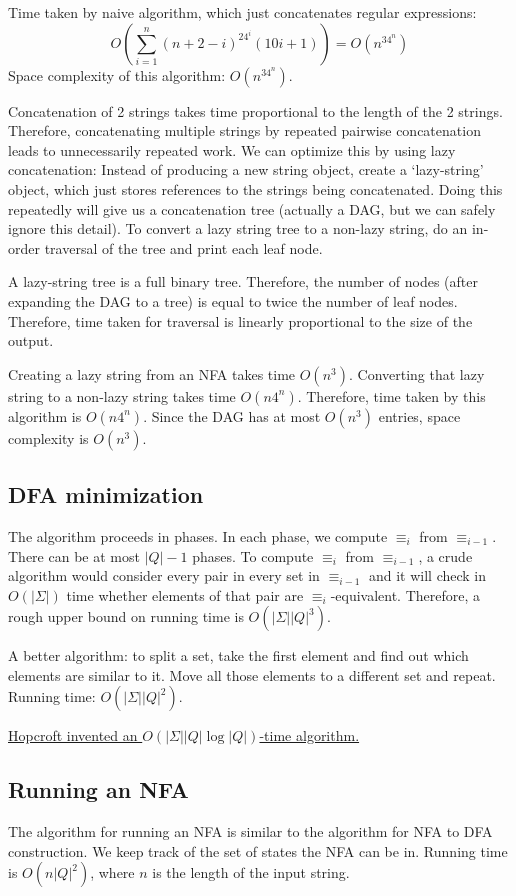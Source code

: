 Time taken by naive algorithm, which just concatenates regular expressions:
\[ O\left(\sum_{i=1}^n (n+2-i)^24^i(10i+1)\right) = O(n^34^n) \]
Space complexity of this algorithm: $O(n^34^n)$.

Concatenation of 2 strings takes time proportional to the length of the 2 strings.
Therefore, concatenating multiple strings by repeated pairwise concatenation leads to
unnecessarily repeated work.
We can optimize this by using lazy concatenation: Instead of producing a new string object,
create a `lazy-string' object, which just stores references to the strings being concatenated.
Doing this repeatedly will give us a concatenation tree (actually a DAG, but we can safely ignore this detail).
To convert a lazy string tree to a non-lazy string,
do an in-order traversal of the tree and print each leaf node.

A lazy-string tree is a full binary tree.
Therefore, the number of nodes (after expanding the DAG to a tree)
is equal to twice the number of leaf nodes.
Therefore, time taken for traversal is linearly proportional to the size of the output.

Creating a lazy string from an NFA takes time $O(n^3)$.
Converting that lazy string to a non-lazy string takes time $O(n4^n)$.
Therefore, time taken by this algorithm is $O(n4^n)$.
Since the DAG has at most $O(n^3)$ entries, space complexity is $O(n^3)$.

\subsection{DFA minimization}

The algorithm proceeds in phases.
In each phase, we compute $\equiv_i$ from $\equiv_{i-1}$.
There can be at most $|Q|-1$ phases.
To compute $\equiv_i$ from $\equiv_{i-1}$, a crude algorithm
would consider every pair in every set in $\equiv_{i-1}$
and it will check in $O(|\Sigma|)$ time whether elements of that
pair are $\equiv_i$-equivalent.
Therefore, a rough upper bound on running time is $O(|\Sigma||Q|^3)$.

A better algorithm: to split a set, take the first element and find out
which elements are similar to it. Move all those elements to a different set
and repeat. Running time: $O(|\Sigma||Q|^2)$.

\href{http://i.stanford.edu/pub/cstr/reports/cs/tr/71/190/CS-TR-71-190.pdf}{
Hopcroft invented an $O(|\Sigma||Q|\log|Q|)$-time algorithm.}

\subsection{Running an NFA}

The algorithm for running an NFA is similar to the algorithm for NFA to DFA construction.
We keep track of the set of states the NFA can be in.
Running time is $O(n|Q|^2)$, where $n$ is the length of the input string.


